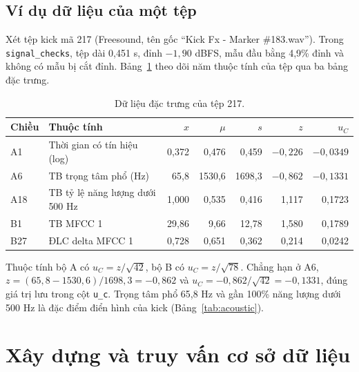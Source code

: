 \documentclass[11pt,a4paper]{article}
\begin{document}
\subsection{Ví dụ dữ liệu của một tệp}
Xét tệp kick mã 217 (Freesound, tên gốc ``Kick Fx - Marker \#183.wav''). Trong \texttt{signal\_checks}, tệp dài 0,451 s, đỉnh $-1{,}90$ dBFS, mẫu đầu bằng 4,9\% đỉnh và không có mẫu bị cắt đỉnh. Bảng~\ref{tab:vidu217} theo dõi năm thuộc tính của tệp qua ba bảng đặc trưng.
\begin{table}[htbp]
\centering\small
\caption{Dữ liệu đặc trưng của tệp 217.}\label{tab:vidu217}
\begin{tabular}{llrrrrr}
\toprule
Chiều & Thuộc tính & $x$ & $\mu$ & $s$ & $z$ & $u_C$\\\midrule
A1 & Thời gian có tín hiệu (log) & 0,372 & 0,476 & 0,459 & $-0{,}226$ & $-0{,}0349$\\
A6 & TB trọng tâm phổ (Hz) & 65,8 & 1530,6 & 1698,3 & $-0{,}862$ & $-0{,}1331$\\
A18 & TB tỷ lệ năng lượng dưới 500 Hz & 1,000 & 0,535 & 0,416 & 1,117 & 0,1723\\
B1 & TB MFCC 1 & 29,86 & 9,66 & 12,78 & 1,580 & 0,1789\\
B27 & ĐLC delta MFCC 1 & 0,728 & 0,651 & 0,362 & 0,214 & 0,0242\\\bottomrule
\end{tabular}
\end{table}
Thuộc tính bộ A có $u_C=z/\sqrt{42}$, bộ B có $u_C=z/\sqrt{78}$. Chẳng hạn ở A6, $z=(65{,}8-1530{,}6)/1698{,}3=-0{,}862$ và $u_C=-0{,}862/\sqrt{42}=-0{,}1331$, đúng giá trị lưu trong cột \texttt{u\_c}. Trọng tâm phổ 65,8 Hz và gần 100\% năng lượng dưới 500 Hz là đặc điểm điển hình của kick (Bảng~\ref{tab:acoustic}).

\section{Xây dựng và truy vấn cơ sở dữ liệu}\label{sec:xaydung}
\end{document}
